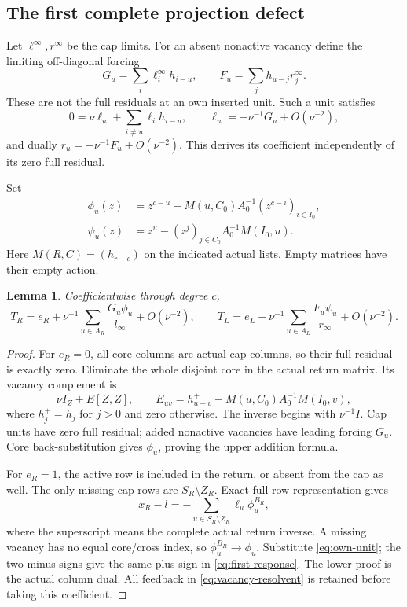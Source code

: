 \documentclass[11pt,a4paper]{amsart}
\numberwithin{equation}{section}
\theoremstyle{plain}
\newtheorem{lemma}[theorem]{Lemma}
\theoremstyle{definition}
\begin{document}
\subsection{The first complete projection defect}
Let \(\ell^\infty,r^\infty\) be the cap limits.  For an absent nonactive vacancy define the limiting off-diagonal forcing
\[
 G_u=\sum_i\ell_i^\infty h_{i-u},\qquad
 F_u=\sum_jh_{u-j}r_j^\infty.
\]
These are not the full residuals at an own inserted unit.  Such a unit satisfies
\begin{equation}\label{eq:own-unit}
 0=\nu\ell_u+\sum_{i\ne u}\ell_i h_{i-u},\qquad
 \ell_u=-\nu^{-1}G_u+O(\nu^{-2}),
\end{equation}
and dually \(r_u=-\nu^{-1}F_u+O(\nu^{-2})\).  This derives its coefficient independently of its zero full residual.

Set
\[
\begin{split}
 \phi_u(z)&=z^{c-u}-M(u,C_0)A_0^{-1}(z^{c-i})_{i\in I_0},\\
 \psi_u(z)&=z^u-(z^j)_{j\in C_0}A_0^{-1}M(I_0,u).
\end{split}
\]
Here \(M(R,C)=(h_{r-c})\) on the indicated actual lists.  Empty matrices have their empty action.

\begin{lemma}\label{lem:first-response}
Coefficientwise through degree \(c\),
\begin{equation}\label{eq:first-response}
 T_R=e_R+\nu^{-1}\sum_{u\in A_R}\frac{G_u\phi_u}{l_\infty}+O(\nu^{-2}),
 \qquad
 T_L=e_L+\nu^{-1}\sum_{u\in A_L}\frac{F_u\psi_u}{r_\infty}+O(\nu^{-2}).
\end{equation}
\end{lemma}
\begin{proof}
For \(e_R=0\), all core columns are actual cap columns, so their full residual is exactly zero.  Eliminate the whole disjoint core in the actual return matrix.  Its vacancy complement is
\begin{equation}\label{eq:vacancy-resolvent}
 \nu I_Z+E[Z,Z],\qquad
 E_{uv}=h^+_{u-v}-M(u,C_0)A_0^{-1}M(I_0,v),
\end{equation}
where \(h^+_j=h_j\) for \(j>0\) and zero otherwise.  The inverse begins with \(\nu^{-1}I\).  Cap units have zero full residual; added nonactive vacancies have leading forcing \(G_u\).  Core back-substitution gives \(\phi_u\), proving the upper addition formula.

For \(e_R=1\), the active row is included in the return, or absent from the cap as well.  The only missing cap rows are \(S_R\setminus Z_R\).  Exact full row representation gives
\[
 x_R-l=-\sum_{u\in S_R\setminus Z_R}\ell_u\phi_u^{B_R},
\]
where the superscript means the complete actual return inverse.  A missing vacancy has no equal core/cross index, so \(\phi_u^{B_R}\to\phi_u\).  Substitute \eqref{eq:own-unit}; the two minus signs give the same plus sign in \eqref{eq:first-response}.  The lower proof is the actual column dual.  All feedback in \eqref{eq:vacancy-resolvent} is retained before taking this coefficient.
\end{proof}
\end{document}
